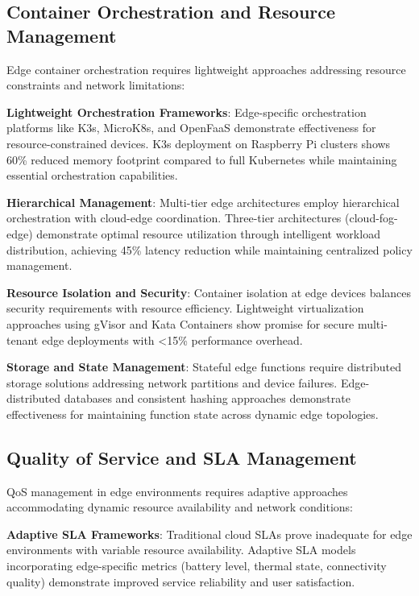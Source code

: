 \subsection{Container Orchestration and Resource Management}

Edge container orchestration requires lightweight approaches addressing resource constraints and network limitations:

\textbf{Lightweight Orchestration Frameworks}: Edge-specific orchestration platforms like K3s, MicroK8s, and OpenFaaS demonstrate effectiveness for resource-constrained devices. K3s deployment on Raspberry Pi clusters shows 60\% reduced memory footprint compared to full Kubernetes while maintaining essential orchestration capabilities.

\textbf{Hierarchical Management}: Multi-tier edge architectures employ hierarchical orchestration with cloud-edge coordination. Three-tier architectures (cloud-fog-edge) demonstrate optimal resource utilization through intelligent workload distribution, achieving 45\% latency reduction while maintaining centralized policy management.

\textbf{Resource Isolation and Security}: Container isolation at edge devices balances security requirements with resource efficiency. Lightweight virtualization approaches using gVisor and Kata Containers show promise for secure multi-tenant edge deployments with <15\% performance overhead.

\textbf{Storage and State Management}: Stateful edge functions require distributed storage solutions addressing network partitions and device failures. Edge-distributed databases and consistent hashing approaches demonstrate effectiveness for maintaining function state across dynamic edge topologies.

\subsection{Quality of Service and SLA Management}

QoS management in edge environments requires adaptive approaches accommodating dynamic resource availability and network conditions:

\textbf{Adaptive SLA Frameworks}: Traditional cloud SLAs prove inadequate for edge environments with variable resource availability. Adaptive SLA models incorporating edge-specific metrics (battery level, thermal state, connectivity quality) demonstrate improved service reliability and user satisfaction.

